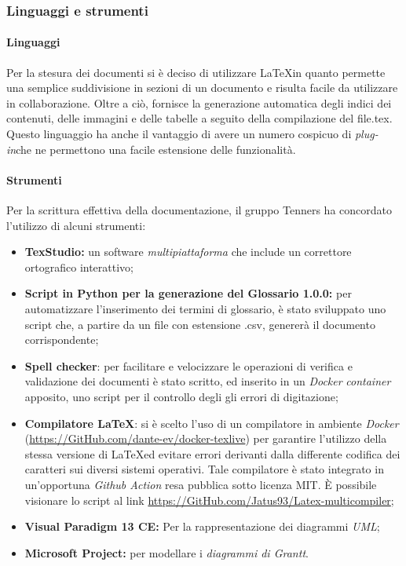 \subsubsection{Linguaggi e strumenti}
\paragraph{Linguaggi}
Per la stesura dei documenti si è deciso di utilizzare \LaTeX \space in quanto permette una semplice suddivisione in sezioni di un documento e risulta facile da utilizzare in collaborazione. Oltre a ciò, fornisce la generazione automatica degli indici dei contenuti, delle immagini e delle tabelle a seguito della compilazione del file.tex. Questo linguaggio ha anche il vantaggio di avere un numero cospicuo di \textit{plug-in}\glo che ne permettono una facile estensione delle funzionalità.

\paragraph{Strumenti}
Per la scrittura effettiva della documentazione, il gruppo Tenners ha concordato l'utilizzo di alcuni strumenti:
\begin{itemize}
	\item \textbf{TexStudio:} un software \textit{multipiattaforma\glo} che include un correttore ortografico interattivo;
	\item \textbf{Script in Python per la generazione del Glossario 1.0.0\docs:} per automatizzare l'inserimento dei termini di glossario, è stato sviluppato uno script che, a partire da un file con estensione .csv, genererà il documento corrispondente;
	\item \textbf{Spell checker}: per facilitare e velocizzare le operazioni di verifica e validazione dei documenti è
	stato scritto, ed inserito in un \textit{Docker\glo} \textit{container\glo} apposito, uno script per il controllo degli gli errori di digitazione;
	\item \textbf{Compilatore \LaTeX}: si è scelto l'uso di un compilatore in ambiente\textit{ Docker\glo} (\url{https://GitHub.com/dante-ev/docker-texlive}) per garantire l'utilizzo della stessa versione di \LaTeX ed evitare errori derivanti dalla differente codifica dei caratteri sui diversi sistemi operativi. Tale compilatore è stato integrato in un'opportuna \textit{Github Action\glo} resa pubblica sotto licenza MIT. È possibile visionare lo script al link \url{https://GitHub.com/Jatus93/Latex-multicompiler};
	\item \textbf{Visual Paradigm 13 CE:} Per la rappresentazione dei diagrammi \textit{UML\glos};
	\item \textbf{Microsoft Project:} per modellare i \textit{diagrammi di Grantt\glos}.
\end{itemize} 


